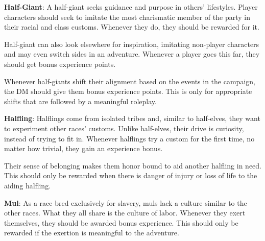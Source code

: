 
\textbf{Half-Giant}: A half-giant seeks guidance and purpose in others' lifestyles. Player characters should seek to imitate the most charismatic member of the party in their racial and class customs. Whenever they do, they should be rewarded for it.

Half-giant can also look elsewhere for inspiration, imitating non-player characters and may even switch sides in an adventure. Whenever a player goes this far, they should get bonus experience points.

Whenever half-giants shift their alignment based on the events in the campaign, the DM should give them bonus experience points. This is only for appropriate shifts that are followed by a meaningful roleplay.


\textbf{Halfling}: Halflings come from isolated tribes and, similar to half-elves, they want to experiment other races' customs. Unlike half-elves, their drive is curiosity, instead of trying to fit in. Whenever halflings try a  custom for the first time, no matter how trivial, they gain an experience bonus.

Their sense of belonging makes them honor bound to aid another halfling in need. This should only be rewarded when there is danger of injury or loss of life to the aiding halfling.


\textbf{Mul}: As a race bred exclusively for slavery, muls lack a culture similar to the other races. What they all share is the culture of labor. Whenever they exert themselves, they should be awarded bonus experience. This should only be rewarded if the exertion is meaningful to the adventure.


